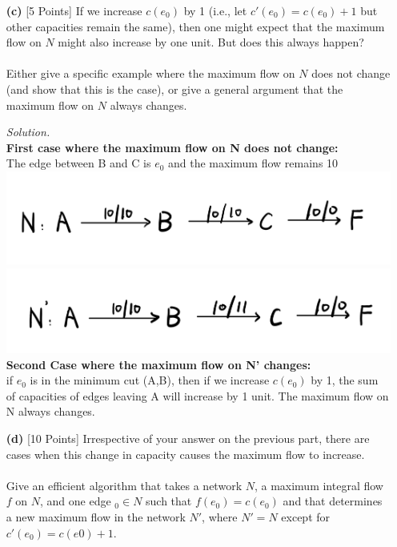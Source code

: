 \documentclass[10pt]{article}
\begin{document}
\begin{enumerate}
\begin{mdframed}
    \end{mdframed}
    \item[\textbf{(c)}] {[5 Points]} If we increase $c(e_0)$ by 1 (i.e., let $c'(e_0) = c(e_0) + 1$ but other capacities remain the same), then one might expect that the maximum flow on $N$ might also increase by one unit. But does this always happen?\\
    \\
    Either give a specific example where the maximum flow on $N$ does not change (and show that this is the case), or give a general argument that the maximum flow on $N$ always changes.
    \begin{mdframed}
        \textit{Solution.}\\
        \textbf{First case where the maximum flow on N does not change:}\\
        The edge between B and C is $e_0$ and the maximum flow remains 10\\
        \includegraphics[scale=0.1]{hw2/incre_N0.jpg}
        \includegraphics[scale=0.1]{hw2/incre_N.jpg}\\
        \textbf{Second Case where the maximum flow on N' changes:}\\
        if $e_0$ is in the minimum cut (A,B), then if we increase $c(e_0)$ by 1, the sum of capacities of edges leaving A will increase by 1 unit. The maximum flow on N always changes.
    \end{mdframed}
    \item[\textbf{(d)}] {[10 Points]} Irrespective of your answer on the previous part, there are cases when this change in capacity causes the maximum flow to increase.\\
    \\
    Give an efficient algorithm that takes a network $N$, a maximum integral flow $f$ on $N$, and one edge $_0 \in N$ such that $f(e_0) = c(e_0)$ and that determines a new maximum flow in the network $N'$, where $N' = N$ except for $c'(e_0) = c(e0) + 1$.\\

\end{enumerate}
\end{document}
